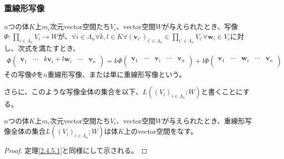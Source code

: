 \documentclass[dvipdfmx]{jsarticle}
\begin{document}
\subsubsection{重線形写像}%
\begin{axs}
$n$つの体$K$上$m_{i}$次元vector空間たち$V_{i}$、vector空間$W$が与えられたとき、写像$\varPhi:\prod_{i \in \varLambda_{n}} V_{i} \rightarrow W$が、$\forall i \in \varLambda_{n}\forall k,l \in K\forall\left( \mathbf{v}_{i'} \right)_{i' \in \varLambda_{n}} \in \prod_{i' \in \varLambda_{n}} V_{i'}\forall\mathbf{w}_{i} \in V_{i}$に対し、次式を満たすとき、
\begin{align*}
\varPhi\begin{pmatrix}
\mathbf{v}_{1} & \cdots & k\mathbf{v}_{i} + l\mathbf{w}_{i} & \cdots & \mathbf{v}_{n} \\
\end{pmatrix} = k\varPhi\begin{pmatrix}
\mathbf{v}_{1} & \cdots & \mathbf{v}_{i} & \cdots & \mathbf{v}_{n} \\
\end{pmatrix} + l\varPhi\begin{pmatrix}
\mathbf{v}_{1} & \cdots & \mathbf{w}_{i} & \cdots & \mathbf{v}_{n} \\
\end{pmatrix}
\end{align*}
その写像$\varPhi$を$n$重線形写像、または単に重線形写像という。\par
さらに、このような写像全体の集合を以下、$L\left( \left( V_{i} \right)_{i \in \varLambda_{n}};W \right)$と書くことにする。
\end{axs}
\begin{thm}\label{2.4.6.2}
$n$つの体$K$上$m_{i}$次元vector空間たち$V_{i}$、vector空間$W$が与えられたとき、重線形写像全体の集合$L\left( \left( V_{i} \right)_{i \in \varLambda_{n}};W \right)$は体$K$上のvector空間をなす。
\end{thm}
\begin{proof} 定理\ref{2.4.5.1}と同様にして示される。
\end{proof}
\end{document}
